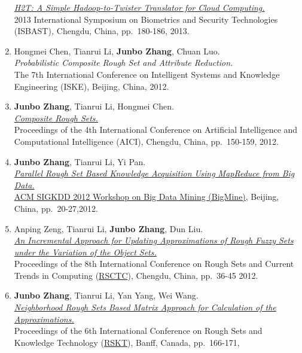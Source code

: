 \documentclass[]{article}
\begin{document}
\begin{enumerate}
  \href{http://dx.doi.org/10.1109/ISBAST.2013.32}{\emph{H2T: A Simple
  Hadoop-to-Twister Translator for Cloud Computing.}}\\ 2013
  International Symposium on Biometrics and Security Technologies
  (ISBAST)\emph{,} Chengdu, China, pp.~180-186, 2013.
\item
  Hongmei Chen, Tianrui Li, \textbf{Junbo Zhang}, Chuan Luo.\\
  \emph{Probabilistic Composite Rough Set and Attribute Reduction.}\\
  The 7th International Conference on Intelligent Systems and Knowledge
  Engineering (ISKE), Beijing, China, 2012.
\item
  \textbf{Junbo Zhang}, Tianrui Li, Hongmei Chen.\\
  \href{http://www.springerlink.com/content/g621611026534074/?MUD=MP}{\emph{Composite
  Rough Sets.}}\\ Proceedings of the 4th International Conference on
  Artificial Intelligence and Computational Intelligence (AICI),
  Chengdu, China, pp.~150-159, 2012.
\item
  \textbf{Junbo Zhang}, Tianrui Li, Yi Pan.\\
  \href{http://doi.acm.org/10.1145/2351316.2351320}{\emph{Parallel Rough
  Set Based Knowledge Acquisition Using MapReduce from Big Data.}}\\
  \href{http://kdd2012.sigkdd.org/workshops.shtml}{ACM SIGKDD 2012
  Workshop on Big Data Mining (BigMine)}, Beijing, China,
  pp.~20-27,2012.
\item
  Anping Zeng, Tianrui Li, \textbf{Junbo Zhang}, Dun Liu.\\
  \href{http://dx.doi.org/10.1007/978-3-642-32115-3_4}{\emph{An
  Incremental Approach for Updating Approximations of Rough Fuzzy Sets
  under the Variation of the Object Sets.}}\\ Proceedings of the 8th
  International Conference on Rough Sets and Current Trends in Computing
  (\href{http://www.informatik.uni-trier.de/~ley/db/conf/rsctc/index.html}{RSCTC}),
  Chengdu, China, pp.~36-45 2012.
\item
  \textbf{Junbo Zhang}, Tianrui Li, Yan Yang, Wei Wang.\\
  \href{http://dx.doi.org/10.1007/978-3-642-24425-4_23}{\emph{Neighborhood
  Rough Sets Based Matrix Approach for Calculation of the
  Approximations.}}\\ Proceedings of the 6th International Conference on
  Rough Sets and Knowledge Technology
  (\href{http://rskt.cs.uregina.ca}{RSKT}), Banff, Canada, pp.~166-171,

\end{enumerate}
\end{document}
